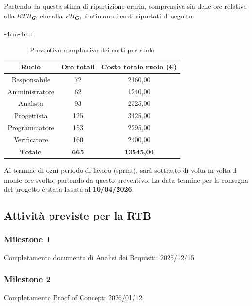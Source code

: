 \documentclass[a4paper,12pt]{article}
\newcommand{\glossario}[1]{\textit{#1}\textsubscript{\textbf{\textit{\textcolor{lightblack}{G}}}}}
\begin{document}
Partendo da questa stima di ripartizione oraria, comprensiva sia delle ore relative alla \glossario{RTB}, che alla \glossario{PB}, si stimano i costi riportati di seguito.
\begin{table}[H]
    \label{tab:preventivo_complessivo}
    \begin{adjustwidth}{-4cm}{-4cm}
    \centering
    \begin{tabular}{|c|c|c|}
        \hline
        \textbf{Ruolo} & \textbf{Ore totali} & \textbf{Costo totale ruolo (€)}  \\
        \hline
        Responsabile & 72 & 2160,00 \\
        \hline
        Amministratore & 62 & 1240,00 \\
        \hline
        Analista & 93 & 2325,00 \\
        \hline
        Progettista & 125 & 3125,00 \\
        \hline
        Programmatore & 153 & 2295,00 \\
        \hline
        Verificatore & 160 & 2400,00 \\
        \hline
        \textbf{Totale} & \textbf{665} & \textbf{13545,00} \\
        \hline
    \end{tabular}
    \caption{Preventivo complessivo dei costi per ruolo}
    \end{adjustwidth}
\end{table}

Al termine di ogni periodo di lavoro (sprint), sarà sottratto di volta in volta il monte ore svolto, partendo da questo preventivo. La data termine per la consegna del progetto è stata fissata al \textbf{10/04/2026}.


\subsection{Attività previste per la RTB}

\subsubsection*{Milestone 1}
Completamento documento di Analisi dei Requisiti: 2025/12/15 

\subsubsection*{Milestone 2}
Completamento Proof of Concept: 2026/01/12 
\end{document}
